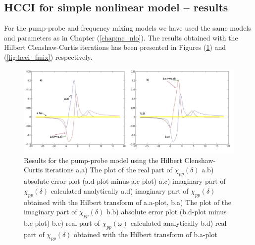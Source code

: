 \documentclass[12pt,twoside,a4paper]{article}
\numberwithin{equation}{subsection}
\numberwithin{figure}{subsection}
\begin{document}
\subsection{HCCI for simple nonlinear model -- results} \label{chap:hcc_nlo}

For the pump-probe and frequency mixing models we have used the same models and parameters as in Chapter (\ref{chap:nc_nlo}). The results obtained with the Hilbert Clenshaw-Curtis iterations has been presented in Figures (\ref{fig:hcci_pnp}) and (\ref{fig:hcci_fmix}) respectively.

\begin{figure} 
  \includegraphics[width=150mm]{img/hcc_pnp.png}
  \caption{Results for the pump-probe model using the Hilbert Clenshaw-Curtis iterations
     a.a) The plot of the real part of ${\chi_{pp}}(\delta )$
     a.b) absolute error plot (a.d-plot minus a.c-plot) 
     a.c) imaginary part of ${\chi_{pp}}(\delta )$ calculated analytically 
     a.d) imaginary part of ${\chi_{pp}}(\delta )$ obtained with the Hilbert transform of a.a-plot, 
     b.a) The plot of the imaginary part of ${\chi_{pp}}(\delta )$ 
     b.b) absolute error plot (b.d-plot minus b.c-plot) 
     b.c) real part of $\chi_{pp} (\omega )$ calculated analytically 
     b.d) real part of ${\chi_{pp}}(\delta )$ obtained with the Hilbert transform of b.a-plot 
     \label{fig:hcci_pnp}
    }
\end{figure} 
\end{document}
